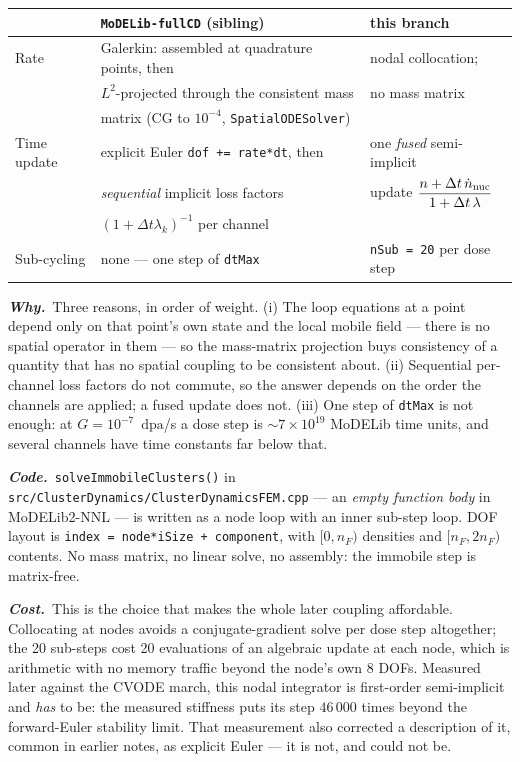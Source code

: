 \documentclass[11pt,a4paper]{article}
\newcommand{\code}[1]{\texttt{\small #1}}
\newcommand{\dpa}{\ensuremath{\mathrm{dpa}}}
\newcommand{\why}[1]{\par\noindent\textbf{\itshape Why.}\ #1\par}
\newcommand{\impact}[1]{\par\noindent\textbf{\itshape Code.}\ #1\par}
\newcommand{\cost}[1]{\par\noindent\textbf{\itshape Cost.}\ #1\par}
\begin{document}
\begin{center}
\begin{tabular}{lll}
\toprule
 & \code{MoDELib-fullCD} (sibling) & this branch \\
\midrule
Rate & Galerkin: assembled at quadrature points, then & nodal collocation; \\
     & $L^2$-projected through the consistent mass    & no mass matrix \\
     & matrix (CG to $10^{-4}$, \code{SpatialODESolver}) & \\[1mm]
Time update & explicit Euler \code{dof += rate*dt}, then & one \emph{fused}
                semi-implicit \\
            & \emph{sequential} implicit loss factors  & update
                $\dfrac{n+\Delta t\,\dot n_{\rm nuc}}{1+\Delta t\,\lambda}$ \\
            & $(1+\Delta t\lambda_k)^{-1}$ per channel & \\[1mm]
Sub-cycling & none --- one step of \code{dtMax} & \code{nSub = 20} per dose
              step \\
\bottomrule
\end{tabular}
\end{center}

\why{Three reasons, in order of weight. (i) The loop equations at a point
depend only on that point's own state and the local mobile field --- there is
no spatial operator in them --- so the mass-matrix projection buys consistency
of a quantity that has no spatial coupling to be consistent about. (ii)
Sequential per-channel loss factors do not commute, so the answer depends on
the order the channels are applied; a fused update does not. (iii) One step of
\code{dtMax} is not enough: at $G=10^{-7}$~\dpa/s a dose step is
$\sim7\times10^{19}$ MoDELib time units, and several channels have time
constants far below that.}
\impact{\code{solveImmobileClusters()} in
\code{src/ClusterDynamics/ClusterDynamicsFEM.cpp} --- an \emph{empty function
body} in MoDELib2-NNL --- is written as a node loop with an inner sub-step
loop. DOF layout is \code{index = node*iSize +
component}, with $[0,n_F)$ densities and $[n_F,2n_F)$ contents. No mass
matrix, no linear solve, no assembly: the immobile step is matrix-free.}
\cost{This is the choice that makes the whole later coupling affordable.
Collocating at nodes avoids a conjugate-gradient solve per dose step
altogether; the 20 sub-steps cost 20 evaluations of an algebraic update at
each node, which is arithmetic with no memory traffic beyond the node's own
$8$ DOFs. Measured later against the CVODE march, this nodal integrator is
first-order semi-implicit and \emph{has} to be: the measured stiffness puts
its step $46\,000$ times beyond the forward-Euler stability limit. That
measurement also corrected a description of it, common in earlier notes, as
explicit Euler --- it is not, and could not be.}
\end{document}
